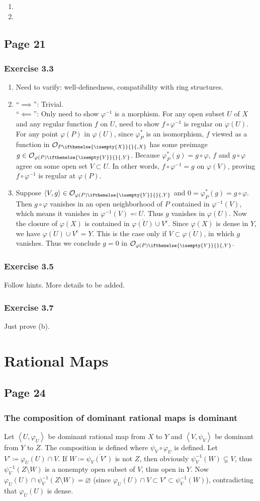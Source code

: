 \documentclass{note}
\newcommand{\Page}[1]{\subsection*{Page #1}}
\newcommand{\Ex}[1]{\subsubsection*{Exercise #1}}
\newcommand{\lring}[2][]{\mathcal{O}_{#2\ifthenelse{\isempty{#1}}{}{,#1}}}
\newcommand{\union}{\cup}
\newcommand{\closure}{\overline}
\newcommand{\cmpl}[1]{#1^\text{c}}
\newcommand{\chevrons}[1]{\left\langle#1\right\rangle}
\newcommand{\rational}[2]{\chevrons{#1,#2}}
\begin{document}
\begin{enumerate}
\item
\item 
\end{enumerate}

\Page{21}

\Ex{3.3}
\begin{enumerate}
\item Need to varify: well-definedness, compatibility with ring
  structures.
\item
  ``$\implies$'': Trivial.\\
  ``$\impliedby$'': Only need to show $\varphi^{-1}$ is a
  morphism. For any open subset $U$ of $X$ and any regular function
  $f$ on $U$, need to show $f\circ\varphi^{-1}$ is regular on
  $\varphi(U)$. For any point $\varphi(P)$ in $\varphi(U)$, since
  $\varphi_P^*$ is an isomorphism, $f$ viewed as a function in
  $\lring[X]{P}$ has some preimage
  $g\in\lring[Y]{\varphi(P)}$. Because
  $\varphi_P^*(g) = g\circ\varphi$, $f$ and $g\circ\varphi$ agree on
  some open set $V\subset U$. In other words, $f\circ\varphi^{-1} = g$ on
  $\varphi(V)$, proving $f\circ\varphi^{-1}$ is regular at
  $\varphi(P)$.
\item Suppose $\chevrons{V,g}\in\lring[Y]{\varphi(P)}$ and
  $0 = \varphi_P^*(g) = g\circ\varphi$. Then $g\circ\varphi$ vanishes
  in an open neighborhood of $P$ contained in $\varphi^{-1}(V)$, which
  means it vanishes in $\varphi^{-1}(V)\eqqcolon U$. Thus $g$ vanishes
  in $\varphi(U)$. Now the closure of $\varphi(X)$ is contained in
  $\closure{\varphi(U)}\union\cmpl{V}$. Since $\varphi(X)$ is dense in
  $Y$, we have $\closure{\varphi(U)}\union\cmpl{V} = Y$. This is the
  case only if $V\subset\closure{\varphi(U)}$, in which $g$
  vanishes. Thus we conclude $g = 0$ in $\lring[Y]{\varphi(P)}$.
\end{enumerate}

\Ex{3.5}
Follow hints. More details to be added.

\Ex{3.7}
Just prove (b).

\section{Rational Maps}
\Page{24}
\subsubsection*{The composition of dominant rational maps is dominant}
Let $\rational{U}{\varphi_U}$ be dominant rational map from $X$ to $Y$
and $\rational{V}{\psi_V}$ be dominant from $Y$ to $Z$. The
composition is defined where $\psi_V\circ\varphi_U$ is defined. Let
$V'\coloneqq\varphi_U(U)\cap V$. If $W\coloneqq\closure{\psi_V(V')}$
is not $Z$, then obviously $\psi_V^{-1}(W) \subsetneq V$, thus
$\psi_V^{-1}(Z\setminus W)$ is a nonempty open subset of $V$, thus
open in $Y$. Now
$\varphi_U(U) \cap \psi_V^{-1}(Z\setminus W) = \varnothing$ (since
$\varphi_U(U) \cap V \subset V' \subset \psi_V^{-1}(W)$),
contradicting that $\varphi_U(U)$ is dense.
\end{document}
